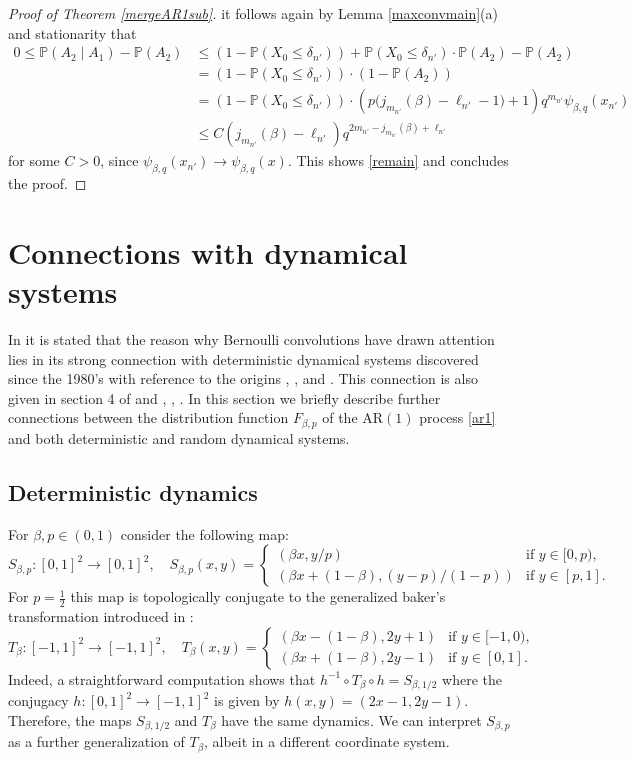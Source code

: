 \documentclass[12pt]{amsart}
\theoremstyle{definition}
\theoremstyle{remark}
\newcommand{\AR}{\operatorname{AR(1)}}
\newcommand{\Pm}{{\mathbb P}}
\numberwithin{equation}{section}
\begin{document}
\begin{proof}[Proof of Theorem \ref{mergeAR1sub}]
it follows again by Lemma \ref{maxconvmain}(a) and stationarity that
\begin{align*}
0\leq \Pm(A_2\mid A_1)-\Pm(A_{2}) & \leq \left(1-\Pm\left(X_{0}\leq\delta_{n'}\right)\right)+\Pm\left(X_{0}\leq\delta_{n'}\right)\cdot\Pm(A_{2})-\Pm(A_{2})\\
& =\left(1-\Pm\left(X_{0}\leq\delta_{n'}\right)\right)\cdot(1-\Pm(A_{2}))\\
& =\left(1-\Pm\left(X_{0}\leq\delta_{n'}\right)\right)\cdot \left(p\big(j_{m_{n'}}(\beta)-\ell_{n'}-1\big)+1\right)q^{m_{n'}}\psi_{\beta,q}(x_{n'})\\
& \leq C\left(j_{m_{n'}}(\beta)-\ell_{n'}\right)q^{2m_{n'}-j_{m_{n'}}(\beta)+\ell_{n'}}
\end{align*}
for some $C>0$, since $\psi_{\beta,q}(x_{n'})\to \psi_{\beta,q}(x)$. This shows \eqref{remain} and concludes the proof.
\end{proof}


\section{Connections with dynamical systems}

In \cite{BSS} it is stated that the reason why Bernoulli convolutions have drawn attention lies in its strong connection with deterministic dynamical systems discovered since the 1980's with reference to the origins \cite{AY}, \cite{PU}, and \cite{Led}. This connection is also given in section 4 of \cite{Sterk} and \cite{Bovier}, \cite{HolSte}, \cite{KemPer}. In this section we briefly describe further connections between the distribution function $F_{\beta,p}$ of the $\AR$ process \eqref{ar1} and both deterministic and random dynamical systems.

\subsection{Deterministic dynamics}

For $\beta, p \in (0,1)$ consider the following map:
\[
S_{\beta, p} : [0,1]^2 \to [0,1]^2, \quad
S_{\beta, p}(x,y) = 
\begin{cases}
	(\beta x, y/p)						& \text{if } y \in [0,p), \\
	(\beta x + (1-\beta), (y-p)/(1-p))	& \text{if } y \in [p,1].
\end{cases}
\]
For $p=\frac{1}{2}$ this map is topologically conjugate to the generalized baker's transformation introduced in \cite{AY}:
\[
T_\beta : [-1,1]^2 \to [-1,1]^2, \quad
T_\beta(x,y) = 
\begin{cases}
	(\beta x - (1-\beta), 2y+1) & \text{if } y \in [-1,0), \\
	(\beta x + (1-\beta), 2y-1) & \text{if } y \in [0,1].
\end{cases}
\]
Indeed, a straightforward computation shows that $h^{-1} \circ T_\beta \circ h = S_{\beta,1/2}$ where the conjugacy $h : [0,1]^2 \to [-1,1]^2$ is given by $h(x,y)=(2x-1,2y-1)$. Therefore, the maps $S_{\beta,1/2}$ and $T_\beta$ have the same dynamics. We can interpret $S_{\beta,p}$ as a further generalization of $T_\beta$, albeit in a different coordinate system.
\end{document}

